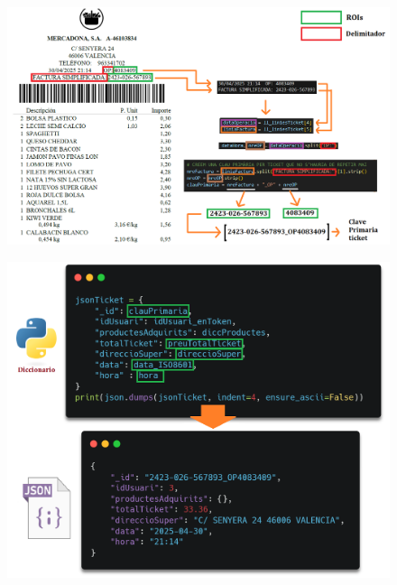 \documentclass{beamer}
\begin{document}
		\begin{frame}
			\begin{figure}
				\centering
				\includegraphics[width=1\linewidth]{imgEspecifiques/ticketExtraccioK.png}
				\label{fig:ticketExtraccioK}
			\end{figure}
		\end{frame}
			
	
			
		\begin{frame}
			\begin{figure}
				\centering
				\includegraphics[width=.8\linewidth]{imgEspecifiques/ticketExtraccioL.png}
				\label{fig:ticketExtraccioL}
			\end{figure}
		\end{frame}
		
\end{document}
